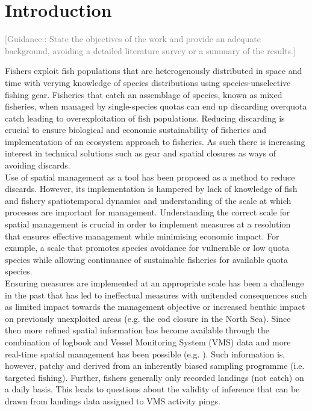 \documentclass[review]{elsarticle}
\begin{document}
\section{Introduction}

\textcolor{gray}{[Guidance:: State the objectives of the work and provide an 
adequate background, avoiding a detailed literature survey or a summary of the
results.] \\}

Fishers exploit fish populations that are heterogenously distributed in space
and time with verying knowledge of species distributions using
species-unselective fishing gear. Fisheries that catch an assemblage of
species, known as mixed fisheries, when managed by single-species quotas can
end up discarding overquota catch leading to overexploitation of fish
populations. Reducing discarding is crucial to ensure biological and economic
sustainability of fisheries and implementation of an ecosystem approach to
fisheries. As such there is increasing interest in technical solutions such as
gear and spatial closures as ways of avoiding discards.  \\

Use of spatial management as a tool has been proposed as a method to reduce
discards. However, its implementation is hampered by lack of knowledge of fish
and fishery spatiotemporal dynamics and understanding of the scale at which
processes are important for management. Understanding the correct scale for
spatial management is crucial in order to implement measures at a resolution
that ensures effective management\cite{Dunn2016} while minimising economic
impact. For example, a scale that promotes species avoidance for vulnerable or
low quota species while allowing continuance of sustainable fisheries for
available quota species. \\

Ensuring measures are implemented at an appropriate scale has been a challenge
in the past that has led to ineffectual measures with unitended consequences
such as limited impact towards the management objective or increased benthic
impact on previously unexploited areas (e.g. the cod closure in the North
Sea\cite{Rijnsdorp2001,Dinmore2003}). Since then more refined spatial
information has become available through the combination of logbook and Vessel
Monitoring System (VMS) data\cite{Lee2010, Bastardie2010, Gerritsen2012,
	Mateo2016} and more real-time spatial management has been possible 
	(e.g. \cite{Holmes2011}). Such information is, however, patchy and
derived from an inherently biased sampling programme (i.e. targeted fishing).
Further, fishers generally only recorded landings (not catch) on a daily basis.
This leads to questions about the validity of inference that can be drawn from
landings data assigned to VMS activity pings. \\ 
\end{document}
